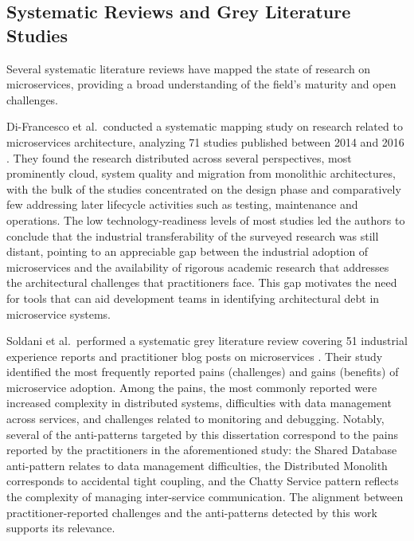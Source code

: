 \subsection{Systematic Reviews and Grey Literature Studies}
\label{subsec:systematic-reviews}

\par Several systematic literature reviews have mapped the state of research on microservices, providing a broad understanding of the field's maturity and open challenges.

Di-Francesco et al.\ conducted a systematic mapping study on research related to microservices architecture, analyzing 71 studies published between 2014 and 2016 \cite{DiFrancesco2017}. They found the research distributed across several perspectives, most prominently cloud, system quality and migration from monolithic architectures, with the bulk of the studies concentrated on the design phase and comparatively few addressing later lifecycle activities such as testing, maintenance and operations. The low technology-readiness levels of most studies led the authors to conclude that the industrial transferability of the surveyed research was still distant, pointing to an appreciable gap between the industrial adoption of microservices and the availability of rigorous academic research that addresses the architectural challenges that practitioners face. This gap motivates the need for tools that can aid development teams in identifying architectural debt in microservice systems.

Soldani et al.\ performed a systematic grey literature review covering 51 industrial experience reports and practitioner blog posts on microservices \cite{Soldani2018}. Their study identified the most frequently reported pains (challenges) and gains (benefits) of microservice adoption. Among the pains, the most commonly reported were increased complexity in distributed systems, difficulties with data management across services, and challenges related to monitoring and debugging. Notably, several of the anti-patterns targeted by this dissertation correspond to the pains reported by the practitioners in the aforementioned study: the Shared Database anti-pattern relates to data management difficulties, the Distributed Monolith corresponds to accidental tight coupling, and the Chatty Service pattern reflects the complexity of managing inter-service communication. The alignment between practitioner-reported challenges and the anti-patterns detected by this work supports its relevance.

